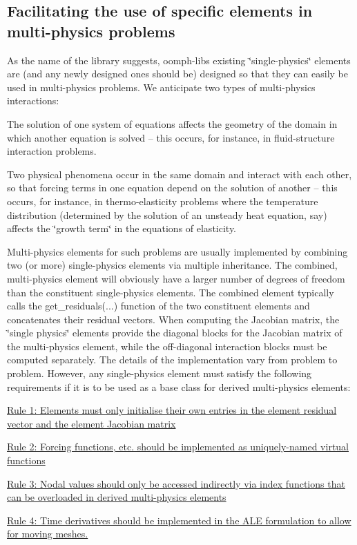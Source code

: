 \hypertarget{index_multi_physics}{}\subsection{Facilitating the use of specific elements in multi-\/physics problems}\label{index_multi_physics}
As the name of the library suggests, {\ttfamily oomph-\/lib\textquotesingle{}s} existing \char`\"{}single-\/physics\char`\"{} elements are (and any newly designed ones should be) designed so that they can easily be used in multi-\/physics problems. We anticipate two types of multi-\/physics interactions\+:
\begin{DoxyItemize}
\item The solution of one system of equations affects the geometry of the domain in which another equation is solved -- this occurs, for instance, in fluid-\/structure interaction problems.
\item Two physical phenomena occur in the same domain and interact with each other, so that forcing terms in one equation depend on the solution of another -- this occurs, for instance, in thermo-\/elasticity problems where the temperature distribution (determined by the solution of an unsteady heat equation, say) affects the \char`\"{}growth term\char`\"{} in the equations of elasticity.
\end{DoxyItemize}Multi-\/physics elements for such problems are usually implemented by combining two (or more) single-\/physics elements via multiple inheritance. The combined, multi-\/physics element will obviously have a larger number of degrees of freedom than the constituent single-\/physics elements. The combined element typically calls the {\ttfamily get\+\_\+residuals}(...) function of the two constituent elements and concatenates their residual vectors. When computing the Jacobian matrix, the \char`\"{}single physics\char`\"{} elements provide the diagonal blocks for the Jacobian matrix of the multi-\/physics element, while the off-\/diagonal interaction blocks must be computed separately. The details of the implementation vary from problem to problem. However, any single-\/physics element must satisfy the following requirements if it is to be used as a base class for derived multi-\/physics elements\+:
\begin{DoxyItemize}
\item \hyperlink{index_dont_wipe}{Rule 1\+: Elements must only initialise their own entries in the element residual vector and the element Jacobian matrix}
\item \hyperlink{index_virtual}{Rule 2\+: Forcing functions, etc. should be implemented as uniquely-\/named virtual functions}
\item \hyperlink{index_index_fcts}{Rule 3\+: Nodal values should only be accessed indirectly via index functions that can be overloaded in derived multi-\/physics elements}
\item \hyperlink{index_mesh_movement}{Rule 4\+: Time derivatives should be implemented in the A\+LE formulation to allow for moving meshes.}
\end{DoxyItemize}




